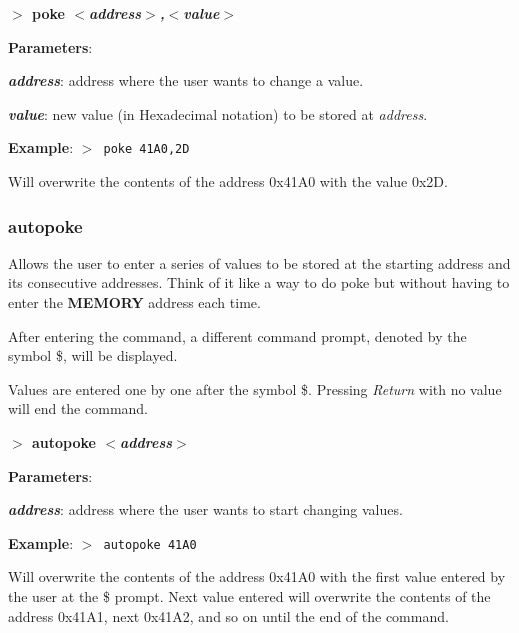 \documentclass[a4paper,11pt]{article}
\begin{document}
        \hspace{1.9cm}\textbf{$>$ poke \textit{$<$address$>$,$<$value$>$}}

        \textbf{Parameters}:

        \hspace{1cm}\textbf{\textit{address}}: address where the user wants
        to change a value.
        
        \hspace{1cm}\textbf{\textit{value}}: new value (in Hexadecimal notation)
        to be stored at \textit{address}.

        \textbf{Example}: \texttt{$>$ poke 41A0,2D}

        Will overwrite the contents of the address 0x41A0 with the value
        0x2D.

        \subsubsection{{\color{blue}autopoke}}
        Allows the user to enter a series of values to be stored at the
        starting address and its consecutive addresses. Think of it like a
        way to do poke but without having to enter the \textbf{MEMORY}
        address each time.

        After entering the command, a different command prompt, denoted by
        the symbol \$, will be displayed.

        Values are entered one by one after the symbol \$. Pressing 
        \textit{Return} with no value will end the command.

        \hspace{1.9cm}\textbf{$>$ autopoke \textit{$<$address$>$}}

        \textbf{Parameters}:

        \hspace{1cm}\textbf{\textit{address}}: address where the user wants
        to start changing values.

        \textbf{Example}: \texttt{$>$ autopoke 41A0}

        Will overwrite the contents of the address 0x41A0 with the first
        value entered by the user at the \$ prompt. Next value entered will
        overwrite the contents of the address 0x41A1, next 0x41A2, and so on
        until the end of the command.
\end{document}
